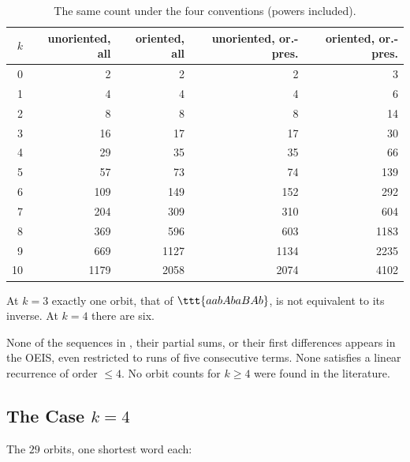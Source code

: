 \documentclass[10pt]{article}
\begin{document}
\begin{table}[H]
	\centering
	\begin{tabular}{r|rrrr}
		\toprule
		$k$ & unoriented, all & oriented, all & unoriented, or.-pres. & oriented, or.-pres. \\
		\midrule
		0 & 2 & 2 & 2 & 3 \\
		1 & 4 & 4 & 4 & 6 \\
		2 & 8 & 8 & 8 & 14 \\
		3 & 16 & 17 & 17 & 30 \\
		4 & 29 & 35 & 35 & 66 \\
		5 & 57 & 73 & 74 & 139 \\
		6 & 109 & 149 & 152 & 292 \\
		7 & 204 & 309 & 310 & 604 \\
		8 & 369 & 596 & 603 & 1183 \\
		9 & 669 & 1127 & 1134 & 2235 \\
		10 & 1179 & 2058 & 2074 & 4102 \\
		\bottomrule
	\end{tabular}
	\caption{The same count under the four conventions (powers included).}
	\label{tab:conventions}
\end{table}

\begin{rmk}
	At $k = 3$ exactly one orbit, that of $\ttt{aabAbaBAb}$, is not equivalent to its inverse.
	At $k = 4$ there are six.
\end{rmk}

\begin{rmk}[OEIS]
	None of the sequences in , their partial sums, or their first differences appears in the OEIS, even restricted to runs of five consecutive terms.
	None satisfies a linear recurrence of order $\leq 4$.
	No orbit counts for $k \geq 4$ were found in the literature.
\end{rmk}

\subsection{The Case $k = 4$}

The $29$ orbits, one shortest word each:
\begin{center}
	 \\
	 \\
	 \\
	 \\
\end{center}
\end{document}

